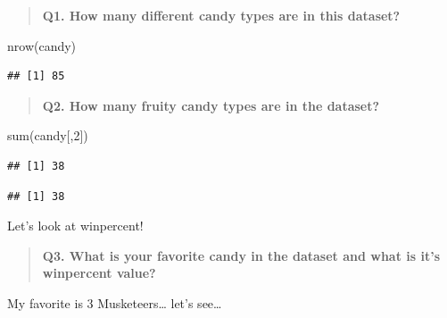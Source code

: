\documentclass[
]{article}
\newenvironment{Shaded}{\begin{snugshade}}{\end{snugshade}}
\newcommand{\CommentTok}[1]{\textcolor[rgb]{0.56,0.35,0.01}{\textit{#1}}}
\newcommand{\DecValTok}[1]{\textcolor[rgb]{0.00,0.00,0.81}{#1}}
\newcommand{\FunctionTok}[1]{\textcolor[rgb]{0.00,0.00,0.00}{#1}}
\newcommand{\NormalTok}[1]{#1}
\newcommand{\SpecialCharTok}[1]{\textcolor[rgb]{0.00,0.00,0.00}{#1}}
\newcommand{\StringTok}[1]{\textcolor[rgb]{0.31,0.60,0.02}{#1}}
\begin{document}
\begin{quote}
\textbf{Q1. How many different candy types are in this dataset?}
\end{quote}

\begin{Shaded}
\begin{Highlighting}[]
\FunctionTok{nrow}\NormalTok{(candy)}
\end{Highlighting}
\end{Shaded}

\begin{verbatim}
## [1] 85
\end{verbatim}

\begin{quote}
\textbf{Q2. How many fruity candy types are in the dataset?}
\end{quote}

\begin{Shaded}
\begin{Highlighting}[]
\FunctionTok{sum}\NormalTok{(candy[,}\DecValTok{2}\NormalTok{])}
\end{Highlighting}
\end{Shaded}

\begin{verbatim}
## [1] 38
\end{verbatim}

\begin{Shaded}
\end{Shaded}

\begin{verbatim}
## [1] 38
\end{verbatim}

Let's look at winpercent!

\begin{quote}
\textbf{Q3. What is your favorite candy in the dataset and what is it's
winpercent value?}
\end{quote}

My favorite is 3 Musketeers\ldots{} let's see\ldots{}

\begin{Shaded}
\end{Shaded}
\end{document}

